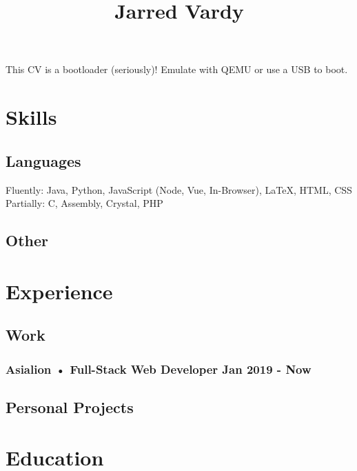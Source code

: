 \documentclass[12pt,a4paper]{article}
\begin{document}
%
\title{Jarred Vardy}
\maketitle
This CV is a bootloader (seriously)! Emulate with QEMU or use a USB to boot.


%
\section{Skills}
\subsection{Languages}
Fluently: Java, Python, JavaScript (Node, Vue, In-Browser), LaTeX, HTML, CSS\\
Partially: C, Assembly, Crystal, PHP

\subsection{Other}

%
\section{Experience}
\subsection{Work}

\subsubsection{Asialion • Full-Stack Web Developer Jan 2019 - Now}

%
\subsection{Personal Projects}

\section{Education}
\end{document}
